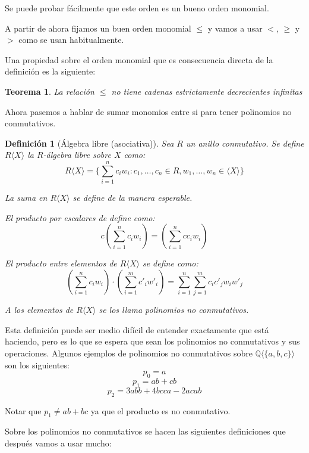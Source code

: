 \documentclass[12pt]{report}
\theoremstyle{customstyle}
\newtheorem{definition}{Definición}[chapter]
\newtheorem{theorem}{Teorema}[chapter]
\theoremstyle{factstyle}
\begin{document}
Se puede probar fácilmente que este orden es un bueno orden monomial.

A partir de ahora fijamos un buen orden monomial $≤$ y vamos a usar $<$, $≥$ y $>$ como se usan habitualmente.

Una propiedad sobre el orden monomial que es consecuencia directa de la definición es la siguiente:

\begin{theorem}\label{thm:≤ no cadenas dec inf}
  La relación $≤$ no tiene cadenas estrictamente decrecientes infinitas
\end{theorem}

Ahora pasemos a hablar de sumar monomios entre si para tener polinomios no conmutativos.

\begin{definition}[Álgebra libre (asociativa)]
  Sea $R$ un anillo conmutativo. Se define $R⟨X⟩$ la $R$-álgebra libre sobre $X$ como:
  \[ R⟨X⟩ = \{∑_{i = 1}^n c_i w_i : c_1, …, c_n ∈ R, w_1, …, w_n ∈ ⟨X⟩\} \]

  La suma en $R⟨X⟩$ se define de la manera esperable.

  El producto por escalares de define como:
  \[ c (∑_{i = 1}^n c_i w_i) = (∑_{i = 1}^n c c_i w_i) \]

  El producto entre elementos de $R⟨X⟩$ se define como:
  \[ (∑_{i = 1}^n c_i w_i) · (∑_{i = 1}^m c'_i w'_i) = ∑_{i = 1}^n ∑_{j = 1}^m c_i c'_j w_i w'_j \]

  A los elementos de $R⟨X⟩$ se los llama polinomios no conmutativos.
\end{definition}

Esta definición puede ser medio difícil de entender exactamente que está haciendo, pero es lo que se espera que sean los polinomios no conmutativos y sus operaciones. Algunos ejemplos de polinomios no conmutativos sobre $ℚ⟨\{a, b, c\}⟩$ son los siguientes:
\[ p_0 = a \]
\[ p_1 = ab + cb \]
\[ p_2 = 3 abb + 4 bcca - 2 acab \]

Notar que $p_1 ≠ ab + bc$ ya que el producto es no conmutativo.

Sobre los polinomios no conmutativos se hacen las siguientes definiciones que después vamos a usar mucho:
\end{document}
